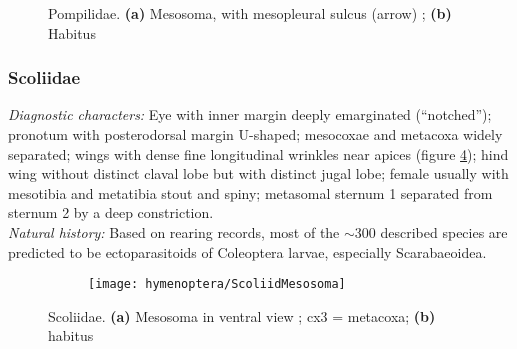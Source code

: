 \begin{figure}[ht]
    \centering
    \begin{subfigure}[ht!]{0.32\textwidth}
        \caption{}
        \label{fig:pompilid2}
    \end{subfigure}
    \qquad
    \begin{subfigure}[ht!]{0.38\textwidth}
        \caption{}
        \label{fig:pompilid3}
    \end{subfigure}
    \caption{Pompilidae. \textbf{(a)} Mesosoma, with mesopleural sulcus (arrow) \citep[][pg. 170]{goulet1993hymenoptera}; \textbf{(b)} Habitus \citep[][Fig. 71]{goulet1993hymenoptera}}\label{fig:pompilid}
\end{figure}

\subsubsection{Scoliidae}
\noindent{}\textit{Diagnostic characters:} Eye with inner margin deeply emarginated (``notched''); pronotum with posterodorsal margin U-shaped; mesocoxae and metacoxa widely separated; wings with dense fine longitudinal wrinkles near apices (figure \ref{fig:scoliid1}); hind wing without distinct claval lobe but with distinct jugal lobe; female usually with mesotibia and metatibia stout and spiny; metasomal sternum 1 separated from sternum 2 by a deep constriction.\\

\noindent{}\textit{Natural history:} Based on rearing records, most of the $\sim$300 described species are predicted to be ectoparasitoids of Coleoptera larvae, especially Scarabaeoidea.

\begin{figure}[ht!]
    \centering
    \begin{subfigure}[ht!]{0.28\textwidth}
        \texttt{[image: hymenoptera/ScoliidMesosoma]}
        \caption{}
        \label{fig:scoliid1}
    \end{subfigure}
    \qquad
    \begin{subfigure}[ht!]{0.38\textwidth}
        \caption{}
        \label{fig:scoliid2}
    \end{subfigure}
    \caption{Scoliidae. \textbf{(a)} Mesosoma in ventral view \citep[][pg. 162]{goulet1993hymenoptera}; cx3 = metacoxa; \textbf{(b)} habitus \citep[][Fig. 78]{goulet1993hymenoptera}}\label{fig:scoliids}
\end{figure}

